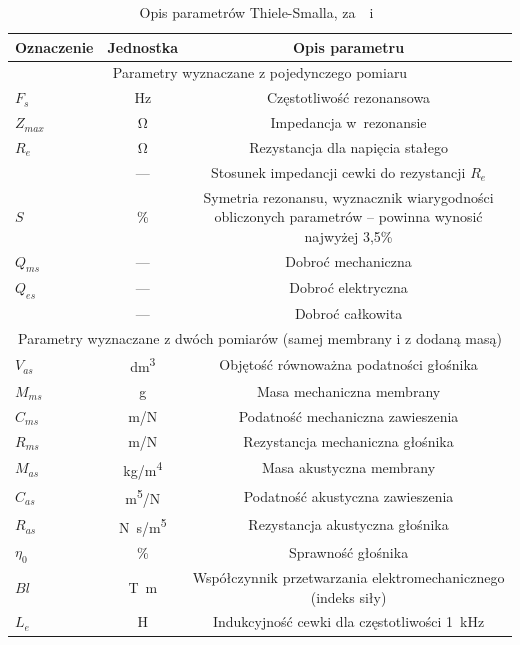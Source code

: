 \documentclass[12pt]{oska}
\begin{document}
	\begin{table}[!ht]
		\centering
		\caption{Opis parametrów Thiele-Smalla, za~\cite{BK_pulse_TS}~i~\cite{dobrucki}}
		\label{t:TS_opis}
		\begin{tabular}{|l|c|c|}
			\hline
			\textbf{Oznaczenie} & \textbf{Jednostka} & \textbf{Opis parametru}\\\hline\hline
			\multicolumn{3}{|c|}{Parametry wyznaczane z pojedynczego pomiaru} \\\hline\hline
			$F_s$ & \si{\hertz} & Częstotliwość rezonansowa \\\hline
			$Z_{max}$ & \si{\ohm} & Impedancja w~rezonansie \\\hline
			$R_e$ & \si{\ohm} & Rezystancja dla napięcia stałego \\\hline
			\gape{$r_0=\frac{Z_{max}}{R_e}$} & --- & Stosunek impedancji cewki do rezystancji $R_e$ \\\hline
			$S$ & \% & \makecell{Symetria rezonansu, wyznacznik wiarygodności\\obliczonych parametrów -- powinna wynosić najwyżej 3,5\%} \\\hline
			\hline
			$Q_{ms}$ & --- & Dobroć mechaniczna \\\hline
			$Q_{es}$ & --- & Dobroć elektryczna \\\hline
			\gape{$Q_{ts}=\frac{Q_{ms}\cdot Q_{es}}{Q_{ms}+Q_{es}}$} & --- & Dobroć całkowita \\\hline
			\hline
			\multicolumn{3}{|c|}{Parametry wyznaczane z dwóch pomiarów (samej membrany i z dodaną masą)} \\\hline\hline
			$V_{as}$ & \si{\deci\metre\cubed} & Objętość równoważna podatności głośnika \\\hline
			$M_{ms}$ & \si{\gram} & Masa mechaniczna membrany \\\hline
			$C_{ms}$ & \si[per-mode=symbol]{\metre\per\newton} & Podatność mechaniczna zawieszenia \\\hline
			$R_{ms}$ & \si[per-mode=symbol]{\metre\per\newton} & Rezystancja mechaniczna głośnika \\\hline
			\hline
			$M_{as}$ & \si[per-mode=symbol]{\kilo\gram\per\metre\tothe{4}} & Masa akustyczna membrany \\\hline
			$C_{as}$ & \si[per-mode=symbol]{\metre\tothe{5}\per\newton} & Podatność akustyczna zawieszenia \\\hline
			$R_{as}$ & \si[per-mode=symbol]{\newton\s\per\metre\tothe{5}} & Rezystancja akustyczna głośnika \\\hline
			\hline
			$\eta_0$ & \% & Sprawność głośnika \\\hline
			$Bl$ & \si{\tesla\metre} & \makecell{Współczynnik przetwarzania elektromechanicznego\\(indeks siły)} \\\hline
			$L_{e}$ & \si{\henry} & Indukcyjność cewki dla częstotliwości \SI{1}{\kilo\hertz} \\\hline
		\end{tabular}
	\end{table}
	
\end{document}
